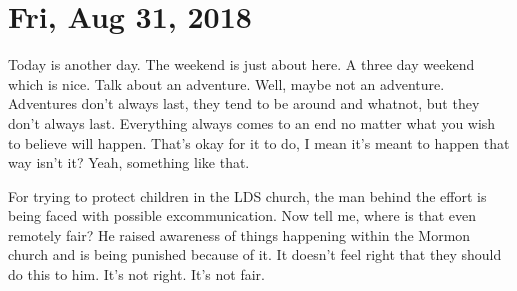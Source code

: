 \section{Fri, Aug 31, 2018}

Today is another day. The weekend is just about here. A three day weekend which is
nice. Talk about an adventure. Well, maybe not an adventure. Adventures don't always
last, they tend to be around and whatnot, but they don't always last. Everything
always comes to an end no matter what you wish to believe will happen. That's okay
for it to do, I mean it's meant to happen that way isn't it? Yeah, something like
that.

For trying to protect children in the LDS church, the man behind the effort is being
faced with possible excommunication. Now tell me, where is that even remotely fair?
He raised awareness of things happening within the Mormon church and is being
punished because of it. It doesn't feel right that they should do this to him. It's
not right. It's not fair.